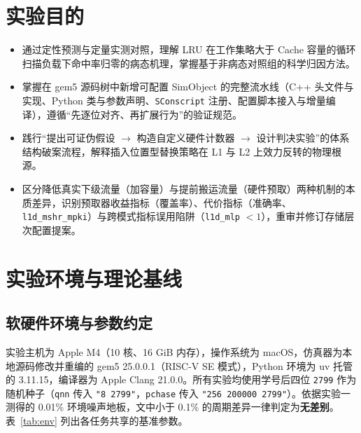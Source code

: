 \documentclass[12pt,a4paper,fontset=mac]{ctexart}
\begin{document}
\section{实验目的}
\begin{itemize}
  \item 通过定性预测与定量实测对照，理解 LRU 在工作集略大于 Cache 容量的循环扫描负载下命中率归零的病态机理，掌握基于非病态对照组的科学归因方法。
  \item 掌握在 gem5 源码树中新增可配置 SimObject 的完整流水线（C++ 头文件与实现、Python 类与参数声明、\texttt{SConscript} 注册、配置脚本接入与增量编译），遵循“先逐位对齐、再扩展行为”的验证规范。
  \item 践行“提出可证伪假设 $\to$ 构造自定义硬件计数器 $\to$ 设计判决实验”的体系结构破案流程，解释插入位置型替换策略在 L1 与 L2 上效力反转的物理根源。
  \item 区分降低真实下级流量（加容量）与提前搬运流量（硬件预取）两种机制的本质差异，识别预取器收益指标（覆盖率）、代价指标（准确率、\texttt{l1d\_mshr\_mpki}）与跨模式指标误用陷阱（\texttt{l1d\_mlp} $<1$），重审并修订存储层次配置提案。
\end{itemize}

\section{实验环境与理论基线}
\subsection{软硬件环境与参数约定}
实验主机为 Apple M4（10 核、16 GiB 内存），操作系统为 macOS，仿真器为本地源码修改并重编的 gem5 25.0.0.1（RISC-V SE 模式），Python 环境为 uv 托管的 3.11.15，编译器为 Apple Clang 21.0.0。所有实验均使用学号后四位 \texttt{2799} 作为随机种子（\texttt{qnn} 传入 \texttt{"8 2799"}，\texttt{pchase} 传入 \texttt{"256 200000 2799"}）。依据实验一测得的 0.01\% 环境噪声地板，文中小于 0.1\% 的周期差异一律判定为\textbf{无差别}。表~\ref{tab:env} 列出各任务共享的基准参数。
\end{document}
